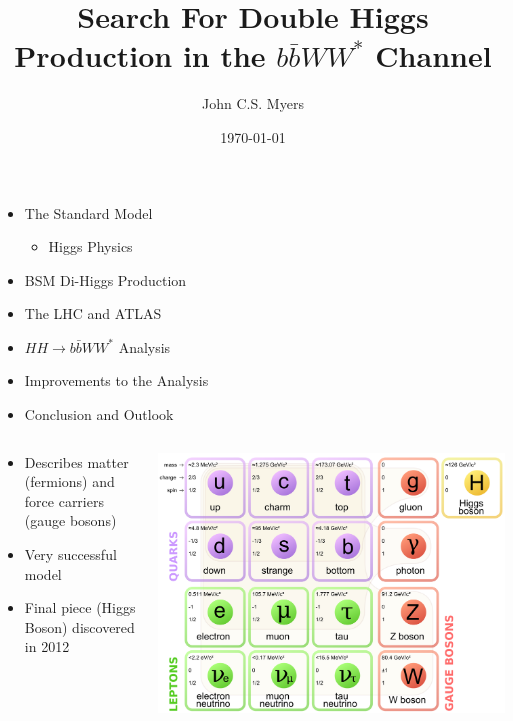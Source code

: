 \documentclass{beamer}
\title{Search For Double Higgs Production in the $b\bar{b}WW^{*}$ Channel}
\subtitle{}
\author[John C.S. Myers]{John C.S. Myers}
\institute[University of Oregon]{ University of Oregon}
\date{\today}
\newcommand*{\header}[1]{\fontsize{16}{8}\selectfont \textbf{{\color{MyPurple}{#1}}}}
\begin{document}
\titlepage


\begin{frame}
\begin{center}
\header{Overview}
\end{center}
\begin{itemize}
\item The Standard Model
\begin{itemize}
\item Higgs Physics
\end{itemize}
\item BSM Di-Higgs Production
\item The LHC and ATLAS
\item $HH\rightarrow{}b\bar{b}WW^{*}$ Analysis
\item Improvements to the Analysis
\item Conclusion and Outlook
\end{itemize}
\end{frame}

\begin{frame}
\begin{center}
\header{The Standard Model}
\end{center}
\begin{columns}
\begin{column}{0.5\textwidth}
\begin{itemize}
\item Describes matter (fermions) and force carriers (gauge bosons)
\item Very successful model
\item Final piece (Higgs Boson) discovered in 2012
\end{itemize}
\end{column}
\begin{column}{0.5\textwidth}
\includegraphics[width=1\textwidth]{figures/Standard_Model_of_Elementary_Particles}
\end{column}
\end{columns}
\end{frame}
\end{document}
